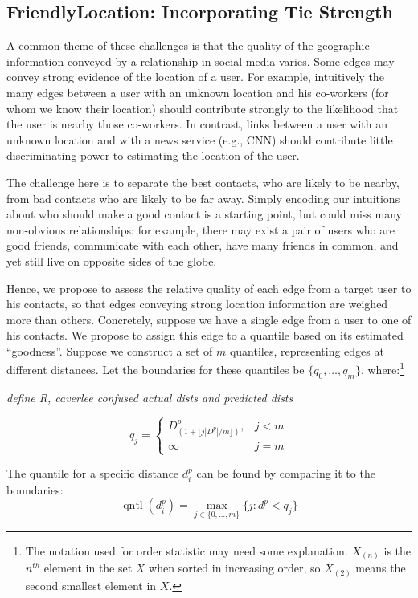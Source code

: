 \documentclass[letterpaper]{article}
\DeclareMathOperator{\quantile}{qntl}
\newcommand{\jam}[1]{\emph{#1}}
\begin{document}
\subsection{FriendlyLocation: Incorporating Tie Strength}
A common theme of these challenges is that the quality of the geographic information conveyed by a relationship in social media varies. Some edges may convey strong evidence of the location of a user. For example, intuitively the many edges between a user with an unknown location and his co-workers (for whom we know their location) should contribute strongly to the likelihood that the user is nearby those co-workers. In contrast, links between a user with an unknown location and with a news service (e.g., CNN) should contribute little discriminating power to estimating the location of the user.

The challenge here is to separate the best contacts, who are likely to be nearby, from bad contacts who are likely to be far away. Simply encoding our intuitions about who should make a good contact is a starting point, but could miss many non-obvious relationships: for example, there may exist a pair of users who are good friends, communicate with each other, have many friends in common, and yet still live on opposite sides of the globe. 

Hence, we propose to assess the relative quality of each edge from a target user to his contacts, so that edges conveying strong location information are weighed more than others. Concretely, suppose we have a single edge from a user to one of his contacts. We propose to assign this edge to a quantile based on its estimated ``goodness''. Suppose we construct a set of $m$ quantiles, representing edges at different distances. Let the boundaries for these quantiles be  $\{q_0,\dots,q_m\}$, where:\footnote{The notation used for order statistic may need some explanation.  $X_{(n)}$ is the $n^{th}$ element in the set $X$ when sorted in increasing order, so $X_{(2)}$ means the second smallest element in $X$.}

\jam{define R, caverlee confused actual dists and predicted dists}

\[
    q_j =
    \begin{cases}
        D^p_{(1+\lfloor j|D^p|/m \rfloor)}, & j<m \\
        \infty & j=m
    \end{cases}
\]

\noindent The quantile for a specific distance $d^p_i$ can be found by comparing it to the boundaries:
\[
    \quantile(d^p_i) = \max_{j \in \{0,\dots,m\}} \{j: d^p<q_j\}
\]
\end{document}
